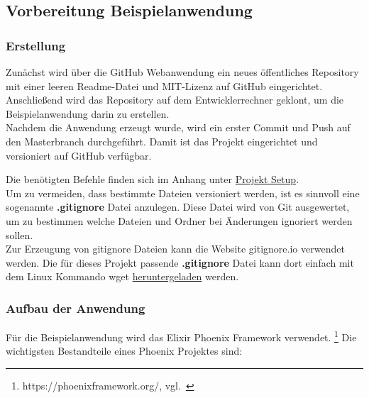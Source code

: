 \subsection{Vorbereitung Beispielanwendung}\label{implementierung_beispielanwendung}

\subsubsection{Erstellung}

Zunächst wird über die GitHub Webanwendung ein neues öffentliches Repository mit einer leeren Readme-Datei und MIT-Lizenz auf GitHub eingerichtet.
Anschließend wird das Repository auf dem Entwicklerrechner geklont, um die Beispielanwendung darin zu erstellen. \\

Nachdem die Anwendung erzeugt wurde, wird ein erster Commit und Push auf den Masterbranch durchgeführt.
Damit ist das Projekt eingerichtet und versioniert auf GitHub verfügbar.

Die benötigten Befehle finden sich im Anhang unter \hyperref[lst:projekt_setup]{Projekt Setup}. \\

Um zu vermeiden, dass bestimmte Dateien versioniert werden, ist es sinnvoll eine sogenannte \textbf{.gitignore} Datei anzulegen.
Diese Datei wird von Git ausgewertet, um zu bestimmen welche Dateien und Ordner bei Änderungen ignoriert werden sollen.
\\

Zur Erzeugung von gitignore Dateien kann die Website gitignore.io verwendet werden.
Die für dieses Projekt passende \textbf{.gitignore} Datei kann dort einfach mit dem Linux Kommando wget \hyperref[lst:projekt_setup_gitignore]{heruntergeladen} werden.

\newpage
\subsubsection{Aufbau der Anwendung}

Für die Beispielanwendung wird das Elixir Phoenix Framework verwendet.
\footnote{{https://phoenixframework.org/, vgl.~\cite{PHOENIX}}}
Die wichtigsten Bestandteile eines Phoenix Projektes sind:

